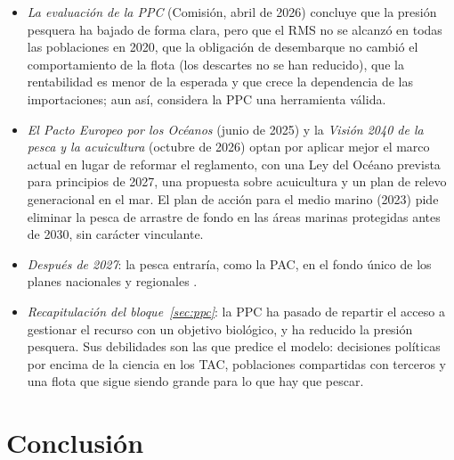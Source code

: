 \documentclass[11pt]{article}
\begin{document}
\begin{itemize}
\item \emph{La evaluación de la PPC} (Comisión, abril de 2026) concluye que la presión pesquera ha bajado de forma clara, pero que el RMS no se alcanzó en todas las poblaciones en 2020, que la obligación de desembarque no cambió el comportamiento de la flota (los descartes no se han reducido), que la rentabilidad es menor de la esperada y que crece la dependencia de las importaciones; aun así, considera la PPC una herramienta válida\nocite{CE2026EvaluacionPPC}.
\item \emph{El Pacto Europeo por los Océanos} (junio de 2025) y la \emph{Visión 2040 de la pesca y la acuicultura} (octubre de 2026) optan por aplicar mejor el marco actual en lugar de reformar el reglamento, con una Ley del Océano prevista para principios de 2027, una propuesta sobre acuicultura y un plan de relevo generacional en el mar\nocite{CE2025Oceanos,CE2026Vision2040}. El plan de acción para el medio marino (2023) pide eliminar la pesca de arrastre de fondo en las áreas marinas protegidas antes de 2030, sin carácter vinculante.
\item \emph{Después de 2027}: la pesca entraría, como la PAC, en el fondo único de los planes nacionales y regionales .
\end{itemize}

\begin{itemize}
\item \emph{Recapitulación del bloque~\ref{sec:ppc}}: la PPC ha pasado de repartir el acceso a gestionar el recurso con un objetivo biológico, y ha reducido la presión pesquera. Sus debilidades son las que predice el modelo: decisiones políticas por encima de la ciencia en los TAC, poblaciones compartidas con terceros y una flota que sigue siendo grande para lo que hay que pescar.
\end{itemize}

\section*{Conclusión}
\end{document}
